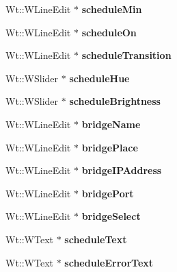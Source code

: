\begin{DoxyCompactItemize}
Wt\+::\+W\+Line\+Edit $\ast$ {\bfseries schedule\+Min}
\item 
\mbox{\label{class_home_page_a71cbd9da103c3f87e6a6ae9d4fd10205}} 
Wt\+::\+W\+Line\+Edit $\ast$ {\bfseries schedule\+On}
\item 
\mbox{\label{class_home_page_ac1edd4f5d53f3ed929c1ee4df2948a7d}} 
Wt\+::\+W\+Line\+Edit $\ast$ {\bfseries schedule\+Transition}
\item 
\mbox{\label{class_home_page_a48cd37e97a4bda9187f623c4e87be295}} 
Wt\+::\+W\+Slider $\ast$ {\bfseries schedule\+Hue}
\item 
\mbox{\label{class_home_page_a66d374ae4e95029b1b5f8a1fe46722f6}} 
Wt\+::\+W\+Slider $\ast$ {\bfseries schedule\+Brightness}
\item 
\mbox{\label{class_home_page_a7457d428fcd698d60f72c95782b39faf}} 
Wt\+::\+W\+Line\+Edit $\ast$ {\bfseries bridge\+Name}
\item 
\mbox{\label{class_home_page_ab04d99877c163415071b9f3a0271513e}} 
Wt\+::\+W\+Line\+Edit $\ast$ {\bfseries bridge\+Place}
\item 
\mbox{\label{class_home_page_a45fd120ec99938f2bfbce184a9ca7286}} 
Wt\+::\+W\+Line\+Edit $\ast$ {\bfseries bridge\+I\+P\+Address}
\item 
\mbox{\label{class_home_page_a4969076e3c84a43fd6619b8f979460e8}} 
Wt\+::\+W\+Line\+Edit $\ast$ {\bfseries bridge\+Port}
\item 
\mbox{\label{class_home_page_aaac28b0dd276a70dc3276d41ffa3cab7}} 
Wt\+::\+W\+Line\+Edit $\ast$ {\bfseries bridge\+Select}
\item 
\mbox{\label{class_home_page_a39443293a3c81cd773edb854adff1f06}} 
Wt\+::\+W\+Text $\ast$ {\bfseries schedule\+Text}
\item 
\mbox{\label{class_home_page_a374f318fc4813cb846eafb26215e87fa}} 
Wt\+::\+W\+Text $\ast$ {\bfseries schedule\+Error\+Text}

\end{DoxyCompactItemize}

